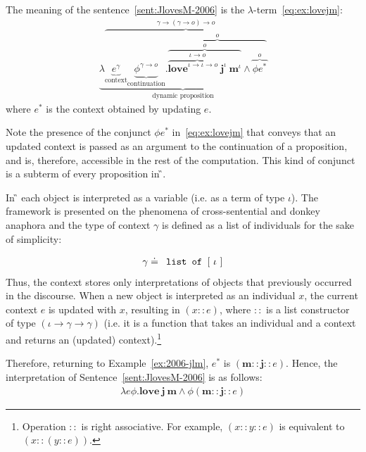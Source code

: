 \begin{example} \label{ex:2006-jlm} The meaning of the sentence~\eqref{sent:JlovesM-2006} is the $\lambda$-term~\eqref{eq:ex:lovejm}:
\begin{align}
\underbrace{\lambda \overbrace{\underbrace{e^{\gamma}}_{\text{context}} \underbrace{\phi^{\gamma \rightarrow o}}_{\text{continuation}}.  \overbrace{\overbrace{ \overbrace{\textbf{love}^{\iota \rightarrow \iota \rightarrow o}  \ \textbf{j}^{\iota}}^{\iota \rightarrow o} \ \textbf{m}^{\iota}}^{o} \land \overbrace{\phi e^*}^{o}}^{o}}^{\gamma \rightarrow (\gamma \rightarrow o) \rightarrow o} }_{\text{dynamic proposition}} \label{eq:ex:lovejm}
\end{align}
where  $e^*$ is the context obtained by updating $e$.
\end{example}

Note the presence of the conjunct $\phi e^*$ in~\eqref{eq:ex:lovejm} that conveys that an updated context is passed as an argument to the continuation of a proposition, and is, therefore, accessible in the rest of the computation.  This kind of conjunct is a subterm of every proposition in {\G}.

In {\G} each object is interpreted as a variable (i.e. as a term of type $\iota$). The framework is presented on the phenomena of cross-sentential and donkey anaphora and the type of context $\gamma$ is defined as a list of individuals for the sake of simplicity:

\begin{align}
\gamma \doteq \texttt{ list of } [ \ \iota \ ] 
\end{align}
Thus, the context stores only interpretations of objects that previously occurred in the discourse. When a new object is interpreted as an individual $x$, the current context $e$ is updated with $x$, resulting in $(x::e)$, where $::$ is a list constructor of type $(\iota \rightarrow \gamma \rightarrow \gamma)$ (i.e. it is a function that takes an individual and a context and returns an (updated) context).\footnote{Operation $::$ is right associative. For example, $(x::y::e)$ is equivalent to $(x::(y::e))$.}

Therefore, returning to Example~\ref{ex:2006-jlm}, $e^*$ is $(\textbf{m} :: \textbf{j} ::{e})$. Hence, the interpretation of Sentence~\eqref{sent:JlovesM-2006} is as follows:
\begin{align}
\lambda e \phi. \textbf{love}  \ \textbf{j} \ \textbf{m} \land \phi (\textbf{m} :: \textbf{j} ::{e}) \label{eq:ex:lovejm-2}
\end{align}

